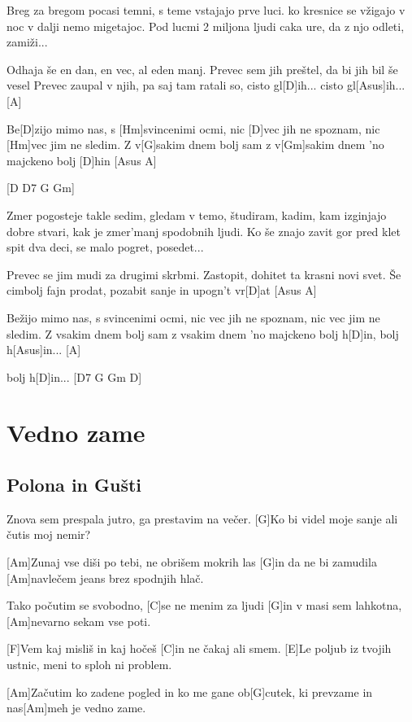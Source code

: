 \documentclass[a4paper,12pt]{article}
\begin{document}
\begin{multicols}{2}
\begin{guitar}
Breg za bregom pocasi temni,
s teme vstajajo prve luci.
ko kresnice se vžigajo v noc
v dalji nemo migetajoc.
Pod lucmi 2 miljona ljudi
caka ure, da z njo odleti, 
zamiži...


Odhaja še en dan,
en vec, al eden manj.
Prevec sem jih preštel,
da bi jih bil še vesel
Prevec zaupal v njih,
pa saj tam ratali so, 
cisto gl[D]ih...
cisto gl[Asus]ih...   [A]

  
Be[D]zijo mimo nas, 
s [Hm]svincenimi ocmi,
nic [D]vec jih ne spoznam,
nic [Hm]vec jim ne sledim.
Z v[G]sakim dnem bolj sam
z v[Gm]sakim dnem 'no majckeno
bolj [D]hin [Asus    A]
 

[D D7 G Gm]

Zmer pogosteje takle sedim,
gledam v temo, študiram, kadim,
kam izginjajo dobre stvari,
kak je zmer'manj spodobnih ljudi.
Ko še znajo zavit gor pred klet
spit dva deci, se malo pogret, 
posedet...


Prevec se jim mudi
za drugimi skrbmi.
Zastopit, dohitet
ta krasni novi svet.
Še cimbolj fajn prodat,
pozabit sanje in
upogn't vr[D]at [Asus    A] 


Bežijo mimo nas, 
s svincenimi ocmi,
nic vec jih ne spoznam,
nic vec jim ne sledim.
Z vsakim dnem bolj sam
z vsakim dnem 'no majckeno 
bolj h[D]in, 
bolj h[Asus]in...   [A] 

bolj h[D]in... [D7   G   Gm   D] 


\end{guitar}
\section{Vedno zame}
\subsection*{Polona in Gušti}
\begin{guitar}
[Am]Znova sem prespala jutro, 
ga prestavim na večer. 
[G]Ko bi videl moje sanje 
ali čutis moj nemir? 


[Am]Zunaj vse diši po tebi,
ne obrišem mokrih las
[G]in da ne bi zamudila 
[Am]navlečem jeans brez 
spodnjih hlač. 


Tako počutim se svobodno,
[C]se ne menim za ljudi
[G]in v masi sem lahkotna, 
[Am]nevarno sekam vse poti. 


[F]Vem kaj misliš in kaj hočeš
[C]in ne čakaj ali smem. 
[E]Le poljub iz tvojih ustnic, 
meni to sploh ni problem. 


[Am]Začutim ko zadene pogled
in ko me gane ob[G]cutek, 
ki prevzame
in nas[Am]meh je vedno zame. 



\end{guitar}
\end{multicols}
\end{document}
